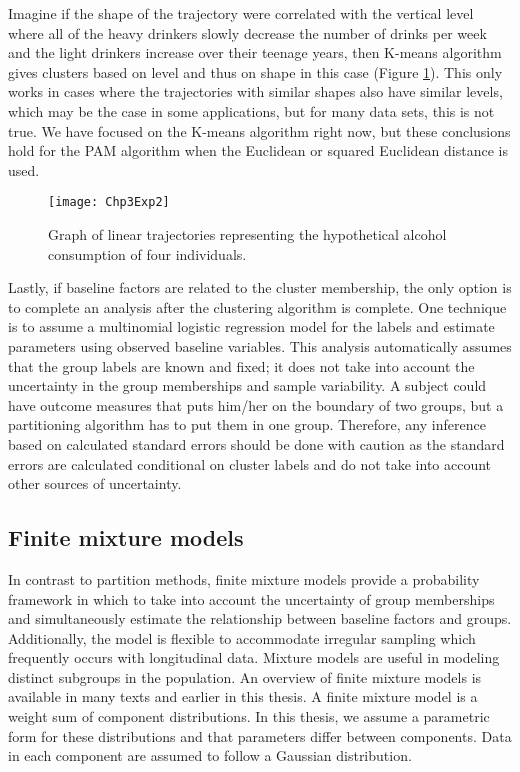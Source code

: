 Imagine if the shape of the trajectory were correlated with the vertical level where all of the heavy drinkers slowly decrease the number of drinks per week and the light drinkers increase over their teenage years, then K-means algorithm gives clusters based on level and thus on shape in this case (Figure \ref{fig:3-2}). This only works in cases where the trajectories with similar shapes also have similar levels, which may be the case in some applications, but for many data sets, this is not true. We have focused on the K-means algorithm right now, but these conclusions hold for the PAM algorithm when the Euclidean or squared Euclidean distance is used.
\begin{figure}
\begin{center}
\texttt{[image: Chp3Exp2]}
\end{center}
\caption{Graph of linear trajectories representing the hypothetical alcohol consumption of four individuals.}
\label{fig:3-2} 
\end{figure}
Lastly, if baseline factors are related to the cluster membership, the only option is to complete an analysis after the clustering algorithm is complete. One technique is to assume a multinomial logistic regression model for the labels and estimate parameters using observed baseline variables. This analysis automatically assumes that the group labels are known and fixed; it does not take into account the uncertainty in the group memberships and sample variability. A subject could have outcome measures that puts him/her on the boundary of two groups, but a partitioning algorithm has to put them in one group. Therefore, any inference based on calculated standard errors should be done with caution as the standard errors are calculated conditional on cluster labels and do not take into account other sources of uncertainty.

\subsection{Finite mixture models}
In contrast to partition methods, finite mixture models provide a probability framework in which to take into account the uncertainty of group memberships and simultaneously estimate the relationship between baseline factors and groups. Additionally, the model is flexible to accommodate irregular sampling which frequently occurs with longitudinal data. Mixture models are useful in modeling distinct subgroups in the population. An overview of finite mixture models is available in many texts \cite{everitt1981,mclachlan1988,mclachlan2000} and earlier in this thesis. A finite mixture model is a weight sum of component distributions. In this thesis, we assume a parametric form for these distributions and that parameters differ between components. Data in each component are assumed to follow a Gaussian distribution.

